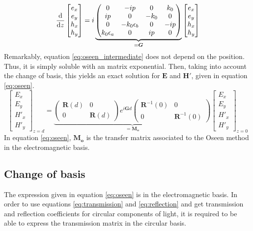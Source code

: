 \begin{eqnarray}
\dv{z}\begin{bmatrix}
e_x\\e_y\\h_x\\h_y
\end{bmatrix} = i\underbrace{\begin{pmatrix}
	0 & -ip & 0 & k_0\\
	ip & 0 & -k_0 & 0\\
	0 & -k_0\epsilon_b & 0 & -ip\\
	k_0\epsilon_a & 0 & ip & 0\\
	\end{pmatrix}}_{=\bm{G}}\begin{bmatrix}
e_x\\e_y\\h_x\\h_y
\end{bmatrix} \label{eq:oseen_intermediate}
\end{eqnarray}
%
Remarkably, equation \ref{eq:oseen_intermediate} does not depend on the position. Thus, it is simply soluble with an matrix exponential. Then, taking into account the change of basis, this yields an exact solution for $\bm{E}$ and $\bm{H'}$, given in equation \ref{eq:oseen}. 
\begin{equation}
\begin{bmatrix}
E_x\\E_y\\H'_x\\H'_y
\end{bmatrix}_{z=d} = \underbrace{\begin{pmatrix}
	\bm{R}(d) & 0\\0 & \bm{R}(d)
	\end{pmatrix}e^{i\bm{G}d}\begin{pmatrix}
		\bm{R}^{-1}(0) & 0\\0 & \bm{R}^{-1}(0)
		\end{pmatrix}}_{=\bm{M_o}}\begin{bmatrix}
E_x\\E_y\\H'_x\\H'_y
\end{bmatrix}_{z=0} \label{eq:oseen}
\end{equation}
%
In equation \ref{eq:oseen}, $\bm{M_o}$ is the transfer matrix associated to the Oseen method in the electromagnetic basis.

\subsection{Change of basis}
\label{sec:chg_basis_oseen}
The expression given in equation \ref{eq:oseen} is in the electromagnetic basis. In order to use equations \ref{eq:transmission} and \ref{eq:reflection} and get transmission and reflection coefficients for circular components of light, it is required to be able to express the transmission matrix in the circular basis.


